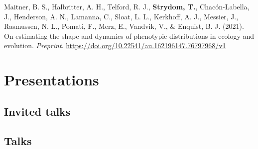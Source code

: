 \documentclass[11pt, a4paper]{awesome-cv}
\begin{document}
\leavevmode{}%
Maitner, B. S., Halbritter, A. H., Telford, R. J., \textbf{Strydom, T.},
Chacón-Labella, J., Henderson, A. N., Lamanna, C., Sloat, L. L.,
Kerkhoff, A. J., Messier, J., Rasmussen, N. L., Pomati, F., Merz, E.,
Vandvik, V., \& Enquist, B. J. (2021). On estimating the shape and
dynamics of phenotypic distributions in ecology and evolution.
\emph{Preprint}. \url{https://doi.org/10.22541/au.162196147.76797968/v1}

\endgroup

\newpage

\hypertarget{presentations}{%
\section{Presentations}\label{presentations}}

\vspace{\baselineskip}

\hypertarget{invited-talks}{%
\subsection{\texorpdfstring{\textbf{Invited
talks}}{Invited talks}}\label{invited-talks}}

\begin{cventries}
    \vspace{-4.0mm}
    \vspace{-4.0mm}
\end{cventries}
\vspace{\baselineskip}

\hypertarget{talks}{%
\subsection{\texorpdfstring{\textbf{Talks}}{Talks}}\label{talks}}

\begin{cventries}
    \vspace{-4.0mm}
\end{cventries}
\end{document}
